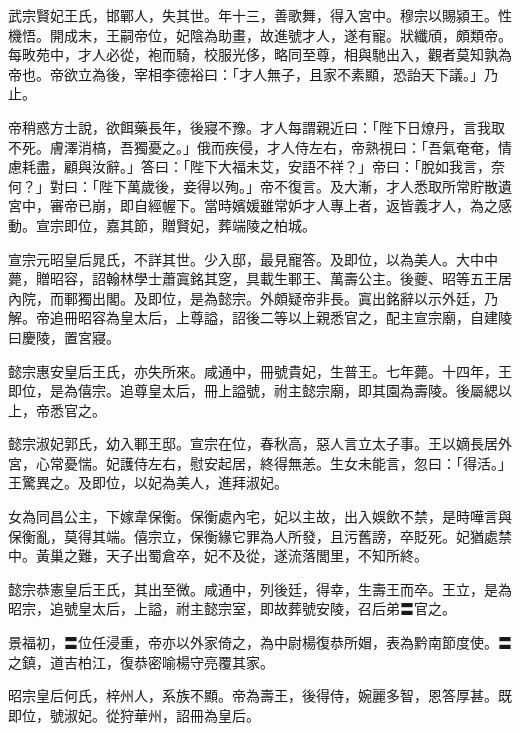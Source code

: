 \begin{pinyinscope}
 武宗賢妃王氏，邯鄲人，失其世。年十三，善歌舞，得入宮中。穆宗以賜潁王。性機悟。開成末，王嗣帝位，妃陰為助畫，故進號才人，遂有寵。狀纖頎，頗類帝。每畋苑中，才人必從，袍而騎，校服光侈，略同至尊，相與馳出入，觀者莫知孰為帝也。帝欲立為後，宰相李德裕曰：「才人無子，且家不素顯，恐詒天下議。」乃止。



 帝稍惑方士說，欲餌藥長年，後寢不豫。才人每謂親近曰：「陛下日燎丹，言我取不死。膚澤消槁，吾獨憂之。」俄而疾侵，才人侍左右，帝熟視曰：「吾氣奄奄，情慮耗盡，顧與汝辭。」答曰：「陛下大福未艾，安語不祥？」帝曰：「脫如我言，奈何？」對曰：「陛下萬歲後，妾得以殉。」帝不復言。及大漸，才人悉取所常貯散遺宮中，審帝已崩，即自經幄下。當時嬪媛雖常妒才人專上者，返皆義才人，為之感動。宣宗即位，嘉其節，贈賢妃，葬端陵之柏城。



 宣宗元昭皇后晁氏，不詳其世。少入邸，最見寵答。及即位，以為美人。大中中薨，贈昭容，詔翰林學士蕭寘銘其窆，具載生鄆王、萬壽公主。後夔、昭等五王居內院，而鄆獨出閣。及即位，是為懿宗。外頗疑帝非長。寘出銘辭以示外廷，乃解。帝追冊昭容為皇太后，上尊謚，詔後二等以上親悉官之，配主宣宗廟，自建陵曰慶陵，置宮寢。



 懿宗惠安皇后王氏，亦失所來。咸通中，冊號貴妃，生普王。七年薨。十四年，王即位，是為僖宗。追尊皇太后，冊上謚號，祔主懿宗廟，即其園為壽陵。後屬緦以上，帝悉官之。



 懿宗淑妃郭氏，幼入鄆王邸。宣宗在位，春秋高，惡人言立太子事。王以嫡長居外宮，心常憂惴。妃護侍左右，慰安起居，終得無恙。生女未能言，忽曰：「得活。」王驚異之。及即位，以妃為美人，進拜淑妃。



 女為同昌公主，下嫁韋保衡。保衡處內宅，妃以主故，出入娛飲不禁，是時嘩言與保衡亂，莫得其端。僖宗立，保衡緣它罪為人所發，且污舊謗，卒貶死。妃猶處禁中。黃巢之難，天子出蜀倉卒，妃不及從，遂流落閭里，不知所終。



 懿宗恭憲皇后王氏，其出至微。咸通中，列後廷，得幸，生壽王而卒。王立，是為昭宗，追號皇太后，上謚，祔主懿宗室，即故葬號安陵，召后弟〓官之。



 景福初，〓位任浸重，帝亦以外家倚之，為中尉楊復恭所媢，表為黔南節度使。〓之鎮，道吉柏江，復恭密喻楊守亮覆其家。



 昭宗皇后何氏，梓州人，系族不顯。帝為壽王，後得侍，婉麗多智，恩答厚甚。既即位，號淑妃。從狩華州，詔冊為皇后。




\end{pinyinscope}
